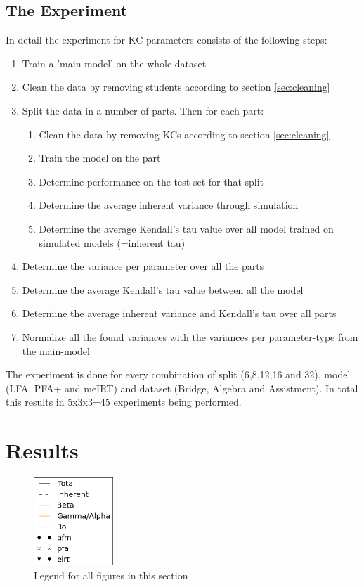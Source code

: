 \documentclass{scrartcl}
\begin{document}
\subsection{The Experiment}
In detail the experiment for KC parameters consists of the following steps:
\begin{enumerate}
\item Train a 'main-model' on the whole dataset
\item Clean the data by removing students according to section \ref{sec:cleaning}
\item Split the data in a number of parts. Then for each part:
\begin{enumerate}
\item Clean the data by removing KCs according to section \ref{sec:cleaning}
\item Train the model on the part
\item Determine performance on the test-set for that split
\item Determine the average inherent variance through simulation
\item Determine the average Kendall's tau value over all model trained on simulated models (=inherent tau)
\end{enumerate}
\item Determine the variance per parameter over all the parts
\item Determine the average Kendall's tau value between all the model
\item Determine the average inherent variance and Kendall's tau over all parts 
\item Normalize all the found variances with the variances per parameter-type from the main-model
\end{enumerate}

The experiment is done for every combination of split (6,8,12,16 and 32), model (LFA, PFA+ and meIRT) and dataset (Bridge, Algebra and Assistment). In total this results in 5x3x3=45 experiments being performed.


\section{Results}

\begin{figure}[h]
\includegraphics[width=30mm]{images/legend.png}
\caption{Legend for all figures in this section}
\label{fig:legend}
\end{figure}
\end{document}
